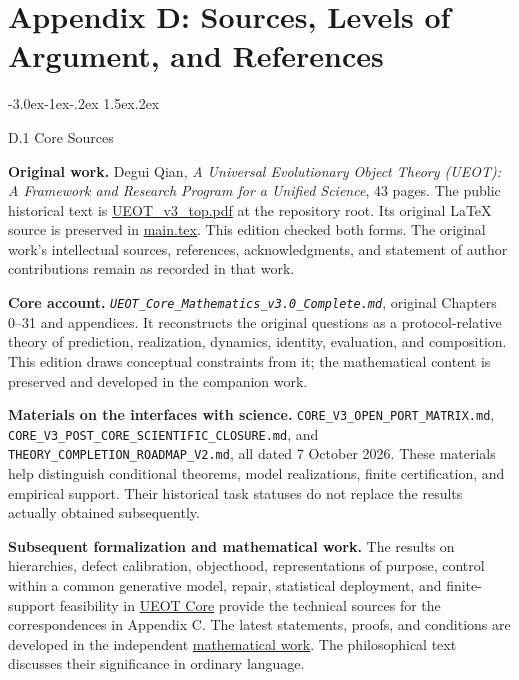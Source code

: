 \documentclass[
  english,
  11pt,
  oneside]{book}
\makeatletter
\renewcommand\section{\@startsection{section}{1}{\z@}%
  {-3.0ex\@plus-1ex\@minus-.2ex}%
  {1.5ex\@plus.2ex}%
  {\normalfont\Large\bfseries\raggedright\hyphenpenalty=10000\exhyphenpenalty=10000}}
\makeatother
\begin{document}
\chapter{Appendix D: Sources, Levels of Argument, and References}\label{ph-app-d}

\section{D.1 Core Sources}\label{ph-d-1}

\textbf{Original work.} Degui Qian, \emph{A Universal Evolutionary Object Theory (UEOT): A Framework and Research Program for a Unified Science}, 43 pages. The public historical text is \href{https://github.com/MurphyHoops/UEOT/blob/3d443ec29eb17af1fc00699a74e2d42d73516d81/UEOT_v3_top.pdf}{UEOT\_v3\_top.pdf} at the repository root. Its original LaTeX source is preserved in \href{https://github.com/MurphyHoops/UEOT/blob/3d443ec29eb17af1fc00699a74e2d42d73516d81/philosophy/source/original/main.tex}{main.tex}. This edition checked both forms. The original work's intellectual sources, references, acknowledgments, and statement of author contributions remain as recorded in that work.

\textbf{Core account.} \emph{\nolinkurl{UEOT_Core_Mathematics_v3.0_Complete.md}}, original Chapters 0--31 and appendices. It reconstructs the original questions as a protocol-relative theory of prediction, realization, dynamics, identity, evaluation, and composition. This edition draws conceptual constraints from it; the mathematical content is preserved and developed in the companion work.

\textbf{Materials on the interfaces with science.} \nolinkurl{CORE_V3_OPEN_PORT_MATRIX.md}, \nolinkurl{CORE_V3_POST_CORE_SCIENTIFIC_CLOSURE.md}, and \nolinkurl{THEORY_COMPLETION_ROADMAP_V2.md}, all dated 7 October 2026. These materials help distinguish conditional theorems, model realizations, finite certification, and empirical support. Their historical task statuses do not replace the results actually obtained subsequently.

\textbf{Subsequent formalization and mathematical work.} The results on hierarchies, defect calibration, objecthood, representations of purpose, control within a common generative model, repair, statistical deployment, and finite-support feasibility in \href{https://github.com/MurphyHoops/UEOT/blob/3d443ec29eb17af1fc00699a74e2d42d73516d81/formalization/ueot-core/}{UEOT Core} provide the technical sources for the correspondences in Appendix C. The latest statements, proofs, and conditions are developed in the independent \href{https://github.com/MurphyHoops/UEOT/blob/3d443ec29eb17af1fc00699a74e2d42d73516d81/mathematics/UEOT_MATHEMATICS.en.md}{mathematical work}. The philosophical text discusses their significance in ordinary language.
\end{document}
